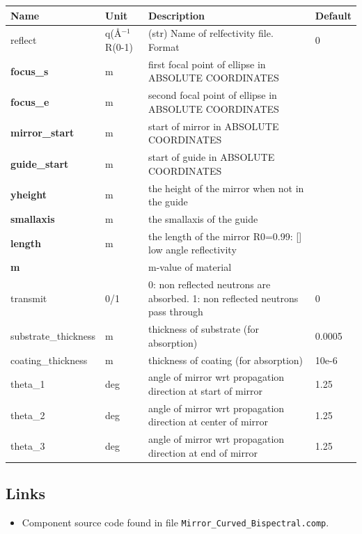 \begin{longtable}{p{}p{}p{}p{}}
\toprule
\textbf{Name} & \textbf{Unit} & \textbf{Description} & \textbf{Default} \\
\midrule
\endhead
reflect & q(\AA{}$^{-1}$ R(0-1) & (str)  Name of relfectivity file. Format & 0 \\
\textbf{focus\_s} & m & first focal point of ellipse in ABSOLUTE COORDINATES &  \\
\textbf{focus\_e} & m & second focal point of ellipse in ABSOLUTE COORDINATES &  \\
\textbf{mirror\_start} & m & start of mirror in ABSOLUTE COORDINATES &  \\
\textbf{guide\_start} & m & start of guide in ABSOLUTE COORDINATES &  \\
\textbf{yheight} & m & the height of the mirror when not in the guide &  \\
\textbf{smallaxis} & m & the smallaxis of the guide &  \\
\textbf{length} & m & the length of the mirror R0=0.99:		[]	low angle reflectivity &  \\
\textbf{m} &  & m-value of material &  \\
transmit & 0/1 & 0: non reflected neutrons are absorbed. 1: non reflected neutrons pass through & 0 \\
substrate\_thickness & m & thickness of substrate (for absorption) & 0.0005 \\
coating\_thickness & m & thickness of coating (for absorption) & 10e-6 \\
theta\_1 & deg & angle of mirror wrt propagation direction at start of mirror & 1.25 \\
theta\_2 & deg & angle of mirror wrt propagation direction at center of mirror & 1.25 \\
theta\_3 & deg & angle of mirror wrt propagation direction at end of mirror & 1.25 \\
\bottomrule
\end{longtable}

\subsection*{Links}
\begin{itemize}
  \item Component source code found in file \texttt{Mirror\_Curved\_Bispectral.comp}.
\end{itemize}

